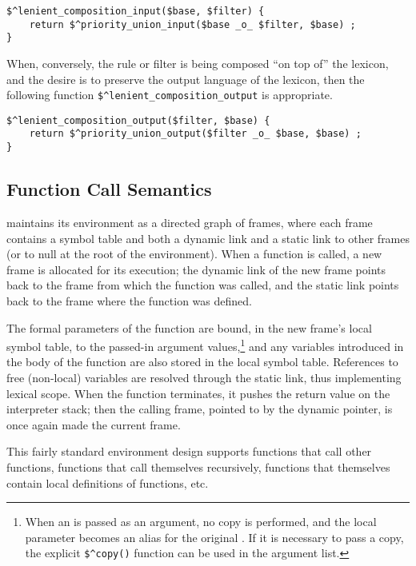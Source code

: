 \begin{Verbatim}
$^lenient_composition_input($base, $filter) {
    return $^priority_union_input($base _o_ $filter, $base) ;
}
\end{Verbatim}

\noindent
When, conversely, the rule or filter is being
composed ``on top of'' the lexicon, and the desire is to
preserve the output language of the lexicon, then the following
function \verb!$^lenient_composition_output! is appropriate.

\begin{Verbatim}
$^lenient_composition_output($filter, $base) {
    return $^priority_union_output($filter _o_ $base, $base) ;
}
\end{Verbatim}



\subsection{Function Call Semantics}

\Kleene{} maintains its environment as a directed graph of frames,
where each frame
contains a symbol table and both a dynamic link and a static link to other frames (or to null at the root of the environment).  When a function is called, a new
frame is allocated for its execution; the dynamic link of the
new frame points back to the frame
from which the function was called, and the static link points back to the
frame where the function was defined.  

The formal parameters of the function are bound, in the new frame's local
symbol table, to the passed-in argument values,\footnote{When an \fsm{} is passed as an argument, no copy is performed, and the local
parameter becomes an alias for the original \fsm{}.  If it is
necessary to pass a copy, the explicit \verb!$^copy()! function can be used
in the argument list.}  and any variables introduced in
the body of the function are also stored in the local symbol
table.  References to free (non-local) variables are resolved
through the static link, thus implementing lexical scope.  When the
function terminates, it pushes the return value on the interpreter stack; then
the calling frame, pointed to by the dynamic
pointer, is once again made the current frame.

This fairly standard environment design supports functions that call other
functions, functions that call themselves recursively, functions
that themselves contain local definitions of functions, etc.  

